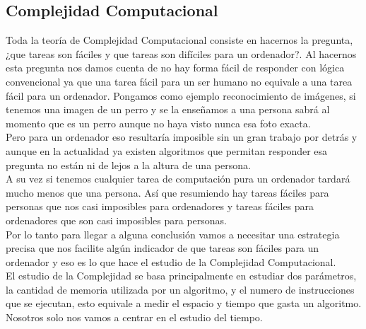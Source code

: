 \documentclass[12pt,a4paper]{article}
\begin{document}
		\subsection{Complejidad Computacional }
		Toda la teoría de Complejidad Computacional consiste en hacernos la pregunta, ¿que tareas son fáciles y que tareas son difíciles para un ordenador?. Al hacernos esta pregunta nos damos cuenta de no hay forma fácil de responder con lógica convencional ya que una tarea fácil para un ser humano no equivale a una tarea fácil para un ordenador. Pongamos como ejemplo reconocimiento de imágenes, si tenemos una imagen de un perro y se la enseñamos a una persona sabrá al momento que es un perro aunque no haya visto nunca esa foto exacta. \\
Pero para un ordenador eso resultaría imposible sin un gran trabajo por detrás y aunque en la actualidad ya existen algoritmos que permitan responder esa pregunta no están ni de lejos a la altura de una persona. \\
A su vez si tenemos cualquier tarea de computación pura un ordenador tardará mucho menos que  una persona. Así que resumiendo hay tareas fáciles para personas que nos casi imposibles para ordenadores y tareas fáciles para ordenadores que son casi imposibles para personas. \\
Por lo tanto para llegar a alguna conclusión vamos a necesitar una estrategia precisa que nos facilite algún indicador de que tareas son fáciles para un ordenador y eso es lo que hace el estudio de la Complejidad Computacional.\\
		 El estudio de la Complejidad se basa principalmente en estudiar dos parámetros, la cantidad de memoria utilizada por un algoritmo, y el numero de instrucciones que se ejecutan, esto equivale a medir el espacio y tiempo que gasta un algoritmo. Nosotros solo nos vamos a centrar en el estudio del tiempo.\\
		 
\end{document}
